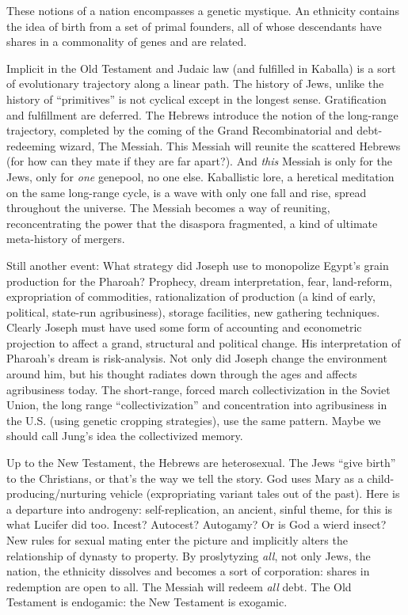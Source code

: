 \documentclass[11pt,twoside,draft]{memoir}
\begin{document}
These notions of a nation encompasses a
genetic mystique. An ethnicity contains the
idea of birth from a set of primal founders, all
of whose descendants have shares in a commonality of genes and are related.

Implicit in the Old Testament and Judaic
law (and fulfilled in Kaballa) is a sort of
evolutionary trajectory along a linear path.
The history of Jews, unlike the history of
\enquote{primitives} is not cyclical except in the
longest sense. Gratification and fulfillment
are deferred. The Hebrews introduce the
notion of the long-range trajectory, completed
by the coming of the Grand Recombinatorial
and debt-redeeming wizard, The Messiah.
This Messiah will reunite the scattered
Hebrews (for how can they mate if they are
far apart?). And \emph{this} Messiah is only for the
Jews, only for \emph{one} genepool, no one else.
Kaballistic lore, a heretical meditation
on the same long-range cycle, is a wave with
only one fall and rise, spread throughout the
universe. The Messiah becomes a way of
reuniting, reconcentrating the power that
the disaspora fragmented, a kind of ultimate
meta-history of mergers.

Still another event: What strategy did
Joseph use to monopolize Egypt's grain production for the Pharoah? Prophecy, dream
interpretation, fear, land-reform, expropriation of commodities, rationalization of production (a kind of early, political, state-run
agribusiness), storage facilities, new gathering techniques. Clearly Joseph must have
used some form of accounting and econometric projection to affect a grand, structural
and political change. His interpretation of
Pharoah's dream is risk-analysis. Not only
did Joseph change the environment around
him, but his thought radiates down through
the ages and affects agribusiness today. The
short-range, forced march collectivization in
the Soviet Union, the long range \enquote{collectivization} and concentration into agribusiness
in the U.S. (using genetic cropping strategies), use the same pattern. Maybe we should
call Jung's idea the collectivized memory.

Up to the New Testament, the Hebrews are
heterosexual. The Jews \enquote{give birth} to the
Christians, or that's the way we tell the story.
God uses Mary as a child-producing\slash nurturing vehicle (expropriating variant tales out
of the past). Here is a departure into androgeny: self-replication, an ancient, sinful
theme, for this is what Lucifer did too. Incest? Autocest? Autogamy? Or is God a
wierd insect? New rules for sexual mating
enter the picture and implicitly alters the relationship of dynasty to property. By proslytyzing \emph{all}, not only Jews, the nation, the
ethnicity dissolves and becomes a sort of
corporation: shares in redemption are open
to all. The Messiah will redeem \emph{all} debt. The
Old Testament is endogamic: the New Testament is exogamic.
\end{document}
